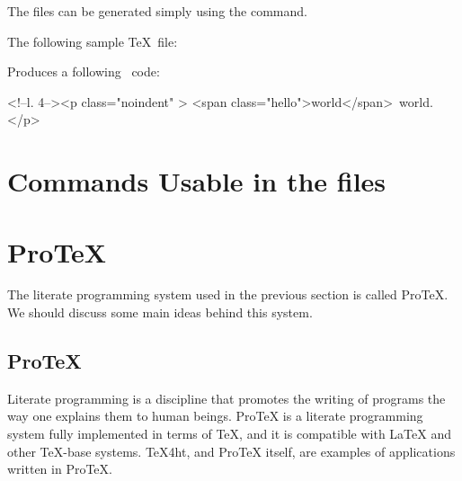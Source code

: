 \begin{texsource}
\end{texsource}

The  files can be generated simply using the  command.

The following sample \TeX\ file:


Produces a following \HTML\ code:

\begin{htmlsource}
<!--l. 4--><p class="noindent" >
<span class="hello">world</span> world. 
</p> 
\end{htmlsource}


\section{Commands Usable in the  files}





\section{ProTeX}


The literate programming system used in the previous section is called ProTeX. We should discuss some main ideas behind this system.

\subsection{ProTeX}

Literate programming is a discipline that promotes the writing of programs the
way one explains them to human beings. ProTeX is a literate programming system
fully implemented in terms of TeX, and it is compatible with LaTeX and other
TeX-base systems. TeX4ht, and ProTeX itself, are examples of applications
written in ProTeX.


